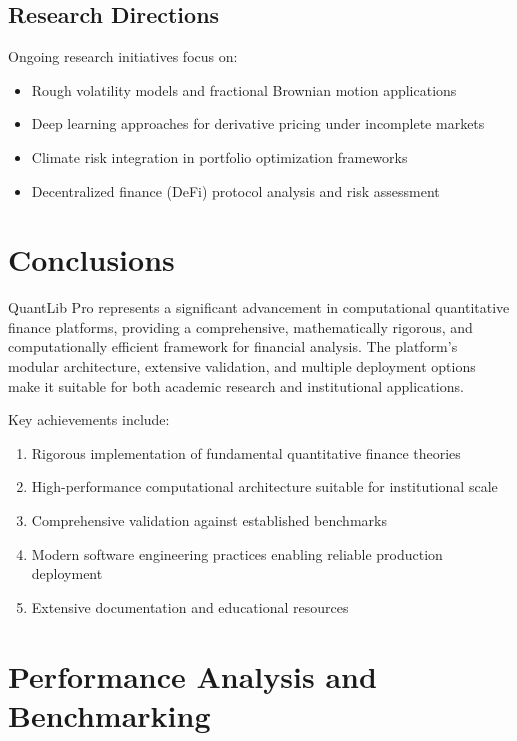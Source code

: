 \documentclass[12pt,a4paper]{article}
\theoremstyle{definition}
\theoremstyle{remark}
\begin{document}
\subsection{Research Directions}

Ongoing research initiatives focus on:

\begin{itemize}
    \item Rough volatility models and fractional Brownian motion applications
    \item Deep learning approaches for derivative pricing under incomplete markets
    \item Climate risk integration in portfolio optimization frameworks
    \item Decentralized finance (DeFi) protocol analysis and risk assessment
\end{itemize}

\section{Conclusions}

QuantLib Pro represents a significant advancement in computational quantitative finance platforms, providing a comprehensive, mathematically rigorous, and computationally efficient framework for financial analysis. The platform's modular architecture, extensive validation, and multiple deployment options make it suitable for both academic research and institutional applications.

Key achievements include:

\begin{enumerate}
    \item Rigorous implementation of fundamental quantitative finance theories
    \item High-performance computational architecture suitable for institutional scale
    \item Comprehensive validation against established benchmarks
    \item Modern software engineering practices enabling reliable production deployment
    \item Extensive documentation and educational resources
\end{enumerate}

\section{Performance Analysis and Benchmarking}
\end{document}
